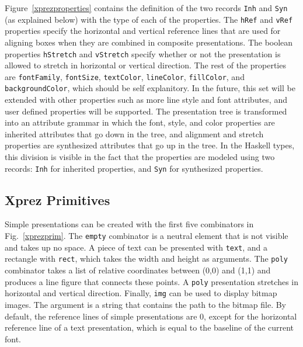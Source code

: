 \noindent Figure~\ref{xprezproperties} contains the definition of the two records \texttt{Inh} and \texttt{Syn} (as explained below) with the type of each of the properties. The \texttt{hRef} and \texttt{vRef} properties specify the horizontal and vertical reference lines that are used for aligning boxes when they are combined in composite presentations. The boolean properties \texttt{hStretch} and \texttt{vStretch} specify whether or not the presentation is allowed to stretch in horizontal or vertical direction. The rest of the properties are \texttt{fontFamily}, \texttt{fontSize}, \texttt{textColor}, \texttt{lineColor}, \texttt{fillColor}, and \texttt{backgroundColor}, which should be self explanitory. In the future, this set will be extended with other properties such as more line style and font attributes, and user defined properties will be supported. The presentation tree is transformed into an attribute grammar in which the font, style, and color properties are inherited attributes that go down in the tree, and alignment and stretch properties are synthesized attributes that go up in the tree. In the Haskell types, this division is visible in the fact that the properties are modeled using two records: \texttt{Inh} for inherited properties, and \texttt{Syn} for synthesized properties.


%									
\subsection{{\sc Xprez} Primitives} \label{primitives}

Simple presentations can be created with the first five combinators in Fig.~\ref{xprezprim}. The \texttt{empty} combinator is a neutral element that is not visible and takes up no space. A piece of text can be presented with \texttt{text}, and a rectangle with \texttt{rect}, which takes the width and height as arguments. The \texttt{poly} combinator takes a list of relative coordinates between (0,0) and (1,1) and produces a line figure that connects these points. A \texttt{poly} presentation stretches in horizontal and vertical direction. Finally, \texttt{img} can be used to display bitmap images. The argument is a string that contains the path to the bitmap file. By default, the reference lines of simple presentations are 0, except for the horizontal reference line of a text presentation, which is equal to the baseline of the current font.

